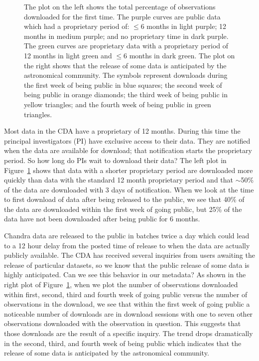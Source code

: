 \begin{figure}[top]
\caption[FirstDownload] 
  { \label{fig:FirstDownload}
The plot on the left shows the total percentage of observations downloaded for the first time.  The purple curves are public data which had a proprietary period of: $\leq 6$ months in light purple; 12 months in medium purple; and no proprietary time in dark purple. The green curves are proprietary data with a proprietary period of 12 months in light green and $\leq 6$ months in dark green.  The plot on the right shows that the release of some data is anticipated by the astronomical community.  The symbols represent downloads during the first week of being public in blue squares; the second week of being public in orange diamonds; the third week of being public in yellow triangles; and the fourth week of being public in green triangles.
}
\end{figure}
 
Most data in the CDA have a proprietary of 12 months.  During this time the principal investigators (PI) have exclusive access to their data.  They are notified when the data are available for download; that notification starts the proprietary period.  So how long do PIs wait to download their data?  The left plot in Figure~\ref{fig:FirstDownload} shows that data with a shorter proprietary period are downloaded more quickly than data with the standard 12 month proprietary period and that $\sim$50\% of the data are downloaded with 3 days of notification.  When we look at the time to first download of data after being released to the public, we see that 40\% of the data are downloaded within the first week of going public, but 25\% of the data have not been downloaded after being public for 6 months.

Chandra data are released to the public in batches twice a day which could lead to a 12 hour delay from the posted time of release to when the data are actually publicly available.  The CDA has received several inquiries from users awaiting the release of particular datasets, so we know that the public release of some data is highly anticipated.  Can we see this behavior in our metadata?  As shown in the right plot of Figure~\ref{fig:FirstDownload}, when we plot the number of observations downloaded within first, second, third and fourth week of going public versus the number of observations in the download, we see that within the first week of going public a noticeable number of downloads are in download sessions with one to seven other observations downloaded with the observation in question.  This suggests that those downloads are the result of a specific inquiry.  The trend drops dramatically in the second, third, and fourth week of being public which indicates that the release of some data is anticipated by the astronomical community.

